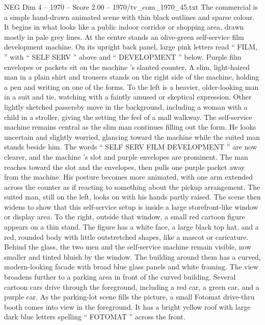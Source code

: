 \begin{textsample}{NEG Dim 4 – 1970 – Score 2.00 – 1970/tv\_com\_1970\_45.txt}  \label{ex:f4_neg_015}
The commercial is a simple hand-drawn animated scene with thin black outlines and sparse colour.
It begins in what looks like a public indoor corridor or shopping area, drawn mostly in pale grey lines.
At the centre stands an olive-green self-service film development machine.
On its upright back panel, large pink letters read “ FILM, ” with “ SELF SERV ” above and “ DEVELOPMENT ” below.
Purple film envelopes or packets sit on the machine ’s slanted counter.
A slim, light-haired man in a plain shirt and trousers stands on the right side of the machine, holding a pen and writing on one of the forms.
To the left is a heavier, older-looking man in a suit and tie, watching with a faintly amused or skeptical expression.
Other lightly sketched passersby move in the background, including a woman with a child in a stroller, giving the setting the feel of a mall walkway.
The self-service machine remains central as the slim man continues filling out the form.
He looks uncertain and slightly worried, glancing toward the machine while the suited man stands beside him.
The words “ SELF SERV FILM DEVELOPMENT ” are now clearer, and the machine ’s slot and purple envelopes are prominent.
The man reaches toward the slot and the envelopes, then pulls one purple packet away from the machine.
His posture becomes more animated, with one arm extended across the counter as if reacting to something about the pickup arrangement.
The suited man, still on the left, looks on with his hands partly raised.
The scene then widens to show that this self-service setup is inside a large storefront-like window or display area.
To the right, outside that window, a small red cartoon figure appears on a thin stand.
The figure has a white face, a large black top hat, and a red, rounded body with little outstretched shapes, like a mascot or caricature.
Behind the glass, the two men and the self-service machine remain visible, now smaller and tinted bluish by the window.
The building around them has a curved, modern-looking facade with broad blue glass panels and white framing.
The view broadens further to a parking area in front of the curved building.
Several cartoon cars drive through the foreground, including a red car, a green car, and a purple car.
As the parking-lot scene fills the picture, a small Fotomat drive-thru booth comes into view in the foreground.
It has a bright yellow roof with large dark blue letters spelling “ FOTOMAT ” across the front.

\end{textsample}
